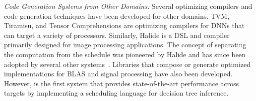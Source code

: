 \emph{Code Generation Systems from Other Domains:}
Several optimizing compilers and code generation techniques have been developed 
for other domains. TVM\cite{TVM}, Tiramisu\cite{Tiramisu}, and Tensor 
Comprehensions\cite{TensorComprehensions} are optimizing compilers 
for DNNs that can target a variety of processors. Similarly, 
Halide\cite{Halide} is a DSL and compiler primarily designed for 
image processing applications. The concept of separating the computation 
from the schedule was pioneered by Halide and has since been adopted 
by several other systems~\cite{TVM,Tiramisu,GraphIt}. 
Libraries that compose or generate optimized implementations  
for BLAS\cite{BLIS, atlas_sc98, CUTLASS} and signal processing\cite{FFTW, SPIRAL}
have also been developed.
However, \Treebeard{} is the first system that provides state-of-the-art performance
across targets by implementing a scheduling language for decision tree inference.

